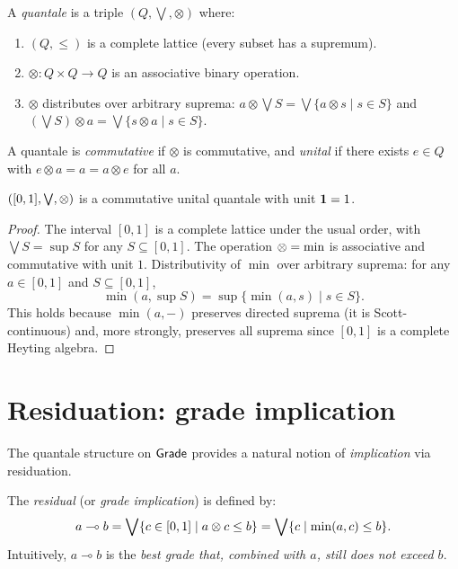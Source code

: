 \begin{definition}[Quantale]
\label{def:quantale}
A \emph{quantale} is a triple $(Q, \bigvee, \otimes)$ where:
\begin{enumerate}[label=(\roman*),nosep]
\item $(Q, \leq)$ is a complete lattice (every subset has a supremum).
\item $\otimes : Q \times Q \to Q$ is an associative binary operation.
\item $\otimes$ distributes over arbitrary suprema:
  $a \otimes \bigvee S = \bigvee \{a \otimes s \mid s \in S\}$
  and
  $(\bigvee S) \otimes a = \bigvee \{s \otimes a \mid s \in S\}$.
\end{enumerate}
A quantale is \emph{commutative} if $\otimes$ is commutative, and
\emph{unital} if there exists $e \in Q$ with $e \otimes a = a = a \otimes e$
for all $a$.
\end{definition}

\begin{theorem}
\label{thm:grade-quantale}
$([0,1], \bigvee, \otimes)$ is a commutative unital quantale with
unit $\mathbf{1} = 1$.
\end{theorem}

\begin{proof}
The interval $[0, 1]$ is a complete lattice under the usual order,
with $\bigvee S = \sup S$ for any $S \subseteq [0, 1]$.  The
operation $\otimes = \min$ is associative and commutative with unit $1$.
Distributivity of $\min$ over arbitrary suprema: for any $a \in [0,1]$
and $S \subseteq [0,1]$,
\[
  \min(a, \sup S)
  = \sup\{\min(a, s) \mid s \in S\}.
\]
This holds because $\min(a, -)$ preserves directed suprema (it is
Scott-continuous) and, more strongly, preserves all suprema since $[0,1]$
is a complete Heyting algebra.
\end{proof}



\section{Residuation: grade implication}
\label{sec:grade:residuation}

The quantale structure on $\mathsf{Grade}$ provides a natural notion of
\emph{implication} via residuation.

\begin{definition}[Residuation]
\label{def:residuation}
The \emph{residual} (or \emph{grade implication}) is defined by:
\[
  a \multimap b
  = \bigvee \{c \in [0,1] \mid a \otimes c \leq b\}
  = \bigvee \{c \mid \min(a, c) \leq b\}.
\]
Intuitively, $a \multimap b$ is the \emph{best grade that, combined
with $a$, still does not exceed $b$}.
\end{definition}

